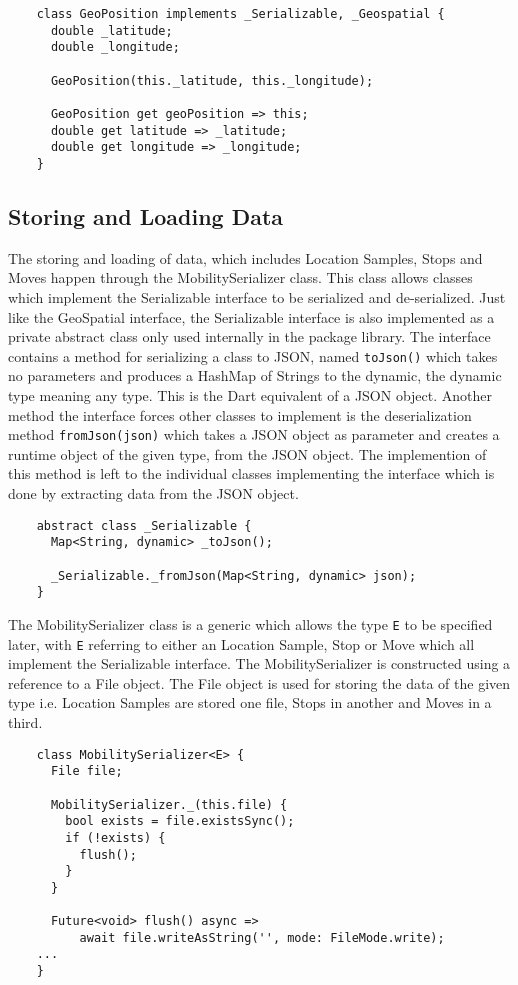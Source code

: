 \begin{verbatim}
    class GeoPosition implements _Serializable, _Geospatial {
      double _latitude;
      double _longitude;
    
      GeoPosition(this._latitude, this._longitude);
    
      GeoPosition get geoPosition => this;
      double get latitude => _latitude;
      double get longitude => _longitude;
    }
\end{verbatim}

\subsection{Storing and Loading Data}
The storing and loading of data, which includes Location Samples, Stops and Moves happen through the MobilitySerializer class. This class allows classes which implement the Serializable interface to be serialized and de-serialized. Just like the GeoSpatial interface, the Serializable interface is also implemented as a private abstract class only used internally in the package library. The interface contains a method for serializing a class to JSON, named \verb|toJson()| which takes no parameters and produces a HashMap of Strings to the dynamic, the dynamic type meaning any type. This is the Dart equivalent of a JSON object. Another method the interface forces other classes to implement is the deserialization method \verb|fromJson(json)| which takes a JSON object as parameter and creates a runtime object of the given type, from the JSON object. The implemention of this method is left to the individual classes implementing the interface which is done by extracting data from the JSON object.

\begin{verbatim}
    abstract class _Serializable {
      Map<String, dynamic> _toJson();
    
      _Serializable._fromJson(Map<String, dynamic> json);
    }
\end{verbatim}

The MobilitySerializer class is a generic which allows the type \verb|E| to be specified later, with \verb|E| referring to either an Location Sample, Stop or Move which all implement the Serializable interface. The MobilitySerializer is constructed using a reference to a File object. The File object is used for storing the data of the given type i.e. Location Samples are stored one file, Stops in another and Moves in a third.

\begin{verbatim}
    class MobilitySerializer<E> {
      File file;
      
      MobilitySerializer._(this.file) {
        bool exists = file.existsSync();
        if (!exists) {
          flush();
        }
      }
      
      Future<void> flush() async =>
          await file.writeAsString('', mode: FileMode.write);
    ...
    }
\end{verbatim}

